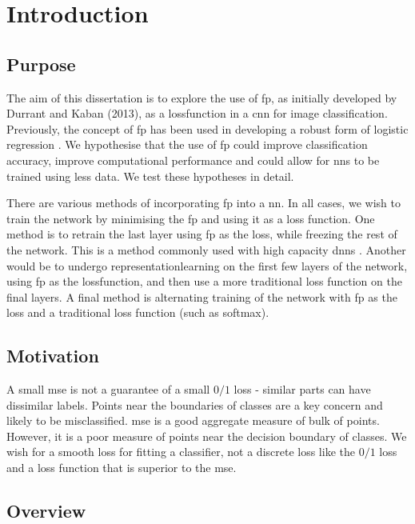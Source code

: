 \chapter{Introduction}

\section{Purpose}

The aim of this dissertation is to explore the use of  \gls{fp}, as initially developed by Durrant and Kaban (2013)\cite{durrant2013sharp}, as a \gls{lossfunction} in a \gls{cnn} for image classification. Previously, the concept of  \gls{fp} has been used in developing a robust form of logistic regression \cite{label_noise}. We hypothesise that the use of  \gls{fp} could improve classification accuracy, improve computational performance and could allow for \gls{nn}s to be trained using less data. We test these hypotheses in detail. \bigskip

There are various methods of incorporating  \gls{fp} into a  \gls{nn}. In all cases, we wish to train the network by minimising the \gls{fp} and using it as a loss function. One method is to retrain the last layer using  \gls{fp} as the loss, while freezing the rest of the network. This is a method commonly used with high capacity \gls{dnn}s \cite{transfer_learning}. Another would be to undergo \gls{representationlearning} on the first few \gls{layer}s of the network, using  \gls{fp} as the \gls{lossfunction}, and then use a more traditional loss function on the final layers. A final method is alternating training of the network with  \gls{fp} as the loss and a traditional loss function (such as \gls{softmax}). 

\section{Motivation}

A small  \gls{mse} is not a guarantee of a small $0/1$ loss - similar parts can have dissimilar labels. Points near the boundaries of classes are a key concern and likely to be misclassified.  \gls{mse} is a good aggregate measure of bulk of points. However, it is a poor measure of points near the decision boundary of classes. We wish for a smooth loss for fitting a classifier, not a discrete loss like the $0/1$ loss and a loss function that is superior to the  \gls{mse}.

\section{Overview}

